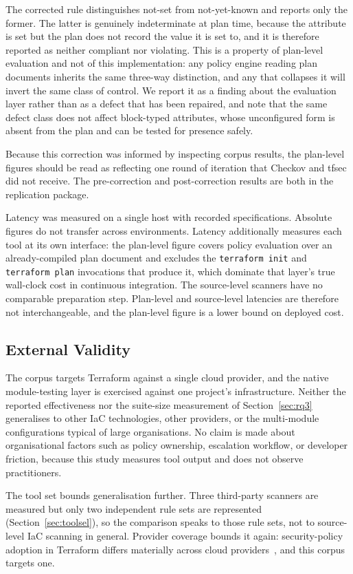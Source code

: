 \documentclass[journal]{IEEEtran}
\begin{document}
The corrected rule distinguishes not-set from not-yet-known and reports only the
former. The latter is genuinely indeterminate at plan time, because the attribute is set
but the plan does not record the value it is set to, and it is therefore reported
as neither compliant nor violating. This is a property of plan-level evaluation and not of
this implementation: any policy engine reading plan documents inherits the same
three-way distinction, and any that collapses it will invert the same class of
control. We report it as a finding about the evaluation layer rather than as a
defect that has been repaired, and note that the same defect class does not affect
block-typed attributes, whose unconfigured form is absent from the plan and can be
tested for presence safely.

Because this correction was informed by inspecting corpus results, the plan-level
figures should be read as reflecting one round of iteration that Checkov and tfsec
did not receive. The pre-correction and post-correction results are both in the
replication package.

Latency was measured on a single host with recorded specifications. Absolute
figures do not transfer across environments. Latency additionally measures each
tool at its own interface: the plan-level figure covers policy evaluation over an
already-compiled plan document and excludes the \texttt{terraform init} and
\texttt{terraform plan} invocations that produce it, which dominate that layer's
true wall-clock cost in continuous integration. The source-level scanners have no
comparable preparation step. Plan-level and source-level latencies are therefore
not interchangeable, and the plan-level figure is a lower bound on deployed cost.

\subsection{External Validity}
The corpus targets Terraform against a single cloud provider, and the native
module-testing layer is exercised against one project's infrastructure. Neither the
reported effectiveness nor the suite-size measurement of Section~\ref{sec:rq3}
generalises to other IaC technologies, other providers, or the multi-module
configurations typical of large organisations. No claim is made about organisational
factors such as policy ownership, escalation workflow, or developer friction,
because this study measures tool output and does not observe practitioners.

The tool set bounds generalisation further. Three third-party scanners are measured
but only two independent rule sets are represented (Section~\ref{sec:toolsel}), so
the comparison speaks to those rule sets, not to source-level IaC scanning in
general. Provider coverage bounds it again: security-policy adoption in Terraform
differs materially across cloud providers~\cite{verdet2025adoption}, and this
corpus targets one.
\end{document}
